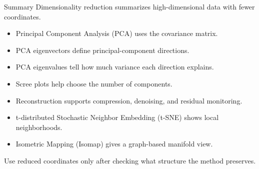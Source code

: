 \documentclass[aspectratio=169]{beamer}
\begin{document}
\begin{frame}{Summary}
\small
Dimensionality reduction summarizes high-dimensional data with fewer coordinates.

\begin{itemize}
\item Principal Component Analysis (PCA) uses the covariance matrix.
\item PCA eigenvectors define principal-component directions.
\item PCA eigenvalues tell how much variance each direction explains.
\item Scree plots help choose the number of components.
\item Reconstruction supports compression, denoising, and residual monitoring.
\item t-distributed Stochastic Neighbor Embedding (t-SNE) shows local neighborhoods.
\item Isometric Mapping (Isomap) gives a graph-based manifold view.
\end{itemize}

\vspace{0.4em}
Use reduced coordinates only after checking what structure the method preserves.
\end{frame}
\end{document}
